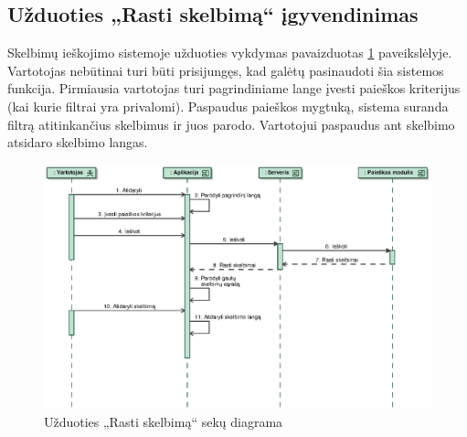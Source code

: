 \documentclass[12pt]{article}
\begin{document}
	\subsection{Užduoties „Rasti skelbimą“ įgyvendinimas}
	Skelbimų ieškojimo sistemoje užduoties vykdymas pavaizduotas \ref{FindAdvertSeq} paveikslėlyje. Vartotojas nebūtinai turi būti prisijungęs, kad galėtų pasinaudoti šia sistemos funkcija. Pirmiausia vartotojas turi pagrindiniame lange įvesti paieškos kriterijus (kai kurie filtrai yra privalomi). Paspaudus paieškos mygtuką, sistema suranda filtrą atitinkančius skelbimus ir juos parodo. Vartotojui paspaudus ant skelbimo atsidaro skelbimo langas.
	\begin{figure}[h]
		\begin{center}
			\includegraphics[width=\textwidth]{RastiSkelbima.eps}
			\caption{Užduoties „Rasti skelbimą“ sekų diagrama\label{FindAdvertSeq}}
		\end{center}
	\end{figure}
	
	
	\pagebreak
	
\end{document}
